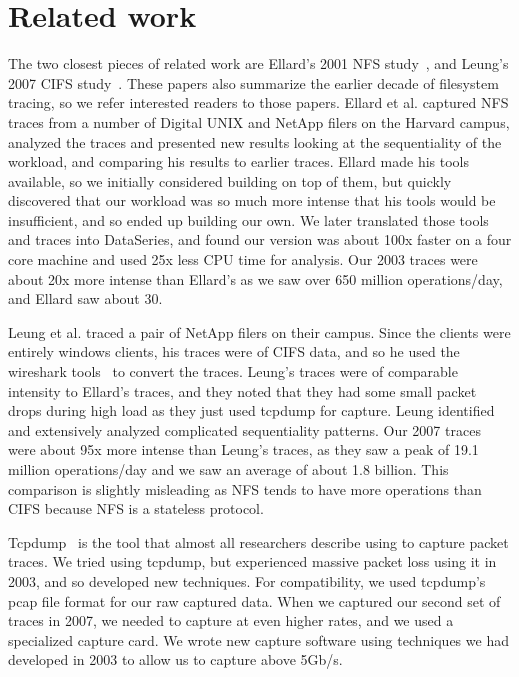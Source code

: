 \section{Related work}
\label{sec:related}

The two closest pieces of related work are Ellard's 2001 NFS
study~\cite{EllardFast03}, and Leung's 2007 CIFS
study~\cite{LeungUsenix08}.  These papers also summarize the earlier
decade of filesystem tracing, so we refer interested readers to those
papers.  Ellard et al. captured NFS traces from a number of Digital
UNIX and NetApp filers on the Harvard campus, analyzed the traces and
presented new results looking at the sequentiality of the workload,
and comparing his results to earlier traces.  Ellard made his tools
available, so we initially considered building on top of them, but
quickly discovered that our workload was so much more intense that his
tools would be insufficient, and so ended up building our own.
We later translated those tools and traces into DataSeries, and 
found our version was about 100x faster on a four core machine and
used 25x less CPU time for analysis.  Our 2003 traces were about 20x
more intense than Ellard's as we saw over 650 million operations/day,
and Ellard saw about 30.

Leung et al. traced a pair of NetApp filers on their campus.
Since the clients were entirely windows clients, his traces were of
CIFS data, and so he used the wireshark tools~\cite{wireshark} to
convert the traces.  Leung's traces were of comparable intensity to
Ellard's traces, and they noted that they had some small packet drops
during high load as they just used tcpdump for capture.  Leung identified and extensively analyzed 
complicated sequentiality patterns.
Our 2007 traces were about 95x more intense than Leung's
traces, as they saw a peak of 19.1 million operations/day and we saw an
average of about 1.8 billion.  This comparison is slightly misleading
as NFS tends to have more operations than CIFS because NFS is a
stateless protocol.

Tcpdump~\cite{tcpdump} is the tool that almost all researchers describe using to capture packet
traces.  We tried using tcpdump, but experienced massive
packet loss using it in 2003, and so developed new techniques.  For
compatibility, we used tcpdump's pcap file format for our raw captured
data.  When we captured our second set of traces in 2007, we needed to
capture at even higher rates, and we used a
specialized capture card. We wrote new capture software using
techniques we had developed in 2003 to allow us to capture above
5Gb/s.

